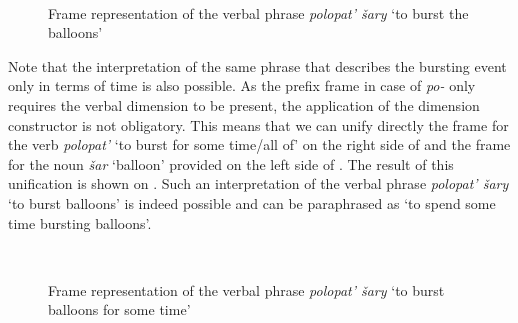 \begin{figure}
\centering
{}\\
\hfill
\caption{Frame representation of the verbal phrase \textit{polopat' \v{s}ary} `to burst the balloons' \label{frame:burst:balloon}}
\end{figure}

Note that the interpretation of the same phrase that describes the bursting event only in terms of time is also possible. As the prefix frame in case of \textit{po-}   only requires the verbal dimension to be present, the application of the dimension constructor is not obligatory. This means that we can unify directly the frame for the verb \textit{polopat'} `to burst for some time/all of' on the right side of  and the frame for the noun \textit{\v{s}ar} `balloon' provided on the left side of . The result of this unification is shown on . Such an interpretation of the verbal phrase \textit{polopat' \v{s}ary} `to burst balloons' is indeed possible and can be paraphrased as `to spend some time bursting balloons'. 

\begin{figure}
\centering
{}\\
\hfill
\caption{Frame representation of the verbal phrase \textit{polopat' \v{s}ary} `to burst balloons for some time' \label{frame:burst:delim}}
\end{figure}

